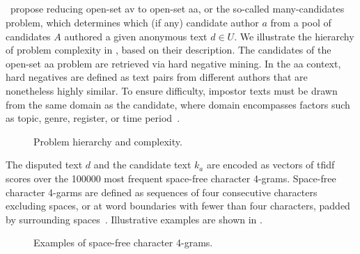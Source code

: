 \subsection{\impApprTitle{}}
\label{sec:impostor_method_theory}

\citet{koppel_determining_2014}\ propose reducing open-set \ac{av} to open-set \ac{aa}, or the so-called many-candidates problem, which determines which (if any) candidate author $a$ from a pool of candidates $A$ authored a given anonymous text $d \in U$. 
We illustrate the hierarchy of problem complexity in , based on their description.
The candidates of the open-set \ac{aa} problem are retrieved via hard negative mining. 
In the \ac{aa} context, hard negatives are defined as text pairs from different authors that are nonetheless highly similar. 
To ensure difficulty, impostor texts must be drawn from the same domain as the candidate, where domain encompasses factors such as topic, genre, register, or time period~\citep{bischoff_importance_2020}. 

\begin{figure}[htbp]
    \centering
    
    \caption{Problem hierarchy and complexity.}
    \label{fig:problem_hierarchy}
\end{figure}

The disputed text $d$ and the candidate text $k_a$ are encoded as vectors of \ac{tfidf} scores over the \num{100000} most frequent space-free character 4-grams.
Space-free character 4-garms are defined as sequences of four consecutive characters excluding spaces, or at word boundaries with fewer than four characters, padded by surrounding spaces~\citep{koppel_authorship_2011,neal_surveying_2018}. 
Illustrative examples are shown in .

\begin{figure}[ht]
    \centering
    \caption{Examples of space-free character 4-grams.}
    \label{fig:spacefree_4gram}
\end{figure}


